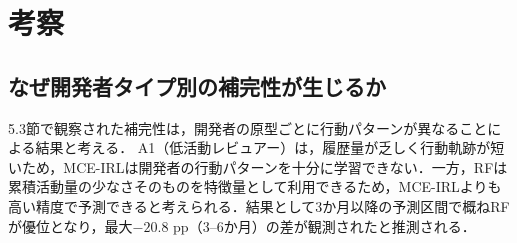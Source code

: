 \documentclass[submit,noauthor,ses,dvipdfmx]{ipsj}
\begin{document}





\section{考察}\label{sec:discuss}

\subsection{なぜ開発者タイプ別の補完性が生じるか}
5.3節で観察された補完性は，開発者の原型ごとに行動パターンが異なることによる結果と考える．
A1（低活動レビュアー）は，履歴量が乏しく行動軌跡が短いため，MCE-IRLは開発者の行動パターンを十分に学習できない．一方，RFは累積活動量の少なさそのものを特徴量として利用できるため，MCE-IRLよりも高い精度で予測できると考えられる．結果として3か月以降の予測区間で概ねRFが優位となり，最大$-20.8$ pp（3--6か月）の差が観測されたと推測される．
\end{document}
